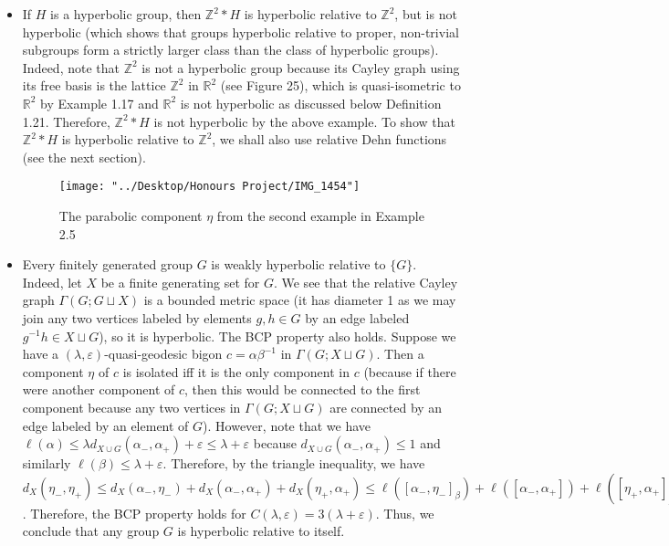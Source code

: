 \documentclass[12pt]{article}
\begin{document}
\begin{itemize}
		\item If $H$ is a hyperbolic group, then $\mathbb{Z}^2 * H$ is hyperbolic relative to $\mathbb{Z}^2$, but is not hyperbolic (which shows that groups hyperbolic relative to proper, non-trivial subgroups form a strictly larger class than the class of hyperbolic groups). Indeed, note that $\mathbb{Z}^2$ is not a hyperbolic group because its Cayley graph using its free basis is the lattice $\mathbb{Z}^2$ in $\mathbb{R}^2$ (see Figure 25), which is quasi-isometric to $\mathbb{R}^2$ by Example 1.17 and $\mathbb{R}^2$ is not hyperbolic as discussed below Definition 1.21. Therefore, $\mathbb{Z}^2 * H$ is not hyperbolic by the above example. To show that $\mathbb{Z}^2 * H$ is hyperbolic relative to $\mathbb{Z}^2$, we shall also use relative Dehn functions (see the next section). 
		
\begin{figure} [H]
	\centering
	\texttt{[image: "../Desktop/Honours Project/IMG\_1454"]}
	\caption{The parabolic component $\eta$ from the second example in Example 2.5}
	\label{fig:img1454}
\end{figure}
		
		\item Every finitely generated group $G$ is weakly hyperbolic relative to $\{G\}$. Indeed, let $X$ be a finite generating set for $G$. We see that the relative Cayley graph $\Gamma(G; G \sqcup X)$ is a bounded metric space (it has diameter 1 as we may join any two vertices labeled by elements $g,h \in G$ by an edge labeled $g^{-1}h \in X \sqcup G$), so it is hyperbolic. The BCP property also holds. Suppose we have a $(\lambda, \varepsilon)$-quasi-geodesic bigon $c = \alpha \beta^{-1}$ in $\Gamma(G; X \sqcup G)$. Then a component $\eta$ of $c$ is isolated iff it is the only component in $c$ (because if there were another component of $c$, then this would be connected to the first component because any two vertices in $\Gamma(G; X \sqcup G)$ are connected by an edge labeled by an element of $G$). However, note that we have $\ell(\alpha) \leq \lambda d_{X \cup G}(\alpha_{-}, \alpha_{+}) + \varepsilon \leq \lambda + \varepsilon $ because $d_{X \cup G}(\alpha_{-}, \alpha_{+}) \leq 1$ and similarly $\ell(\beta) \leq \lambda + \varepsilon$. Therefore, by the triangle inequality, we have $d_X(\eta_-, \eta_+) \leq d_X(\alpha_-, \eta_-) + d_X(\alpha_-, \alpha_+) + d_X(\eta_+, \alpha_+) \leq \ell([\alpha_-, \eta_-]_{\beta}) + \ell([\alpha_-, \alpha_+]) + \ell([\eta_+, \alpha_+]_{\beta}) \leq 3(\lambda + \varepsilon)$. Therefore, the BCP property holds for $C(\lambda, \varepsilon) = 3(\lambda + \varepsilon)$. Thus, we conclude that any group $G$ is hyperbolic relative to itself. 
	\end{itemize}
\end{document}
